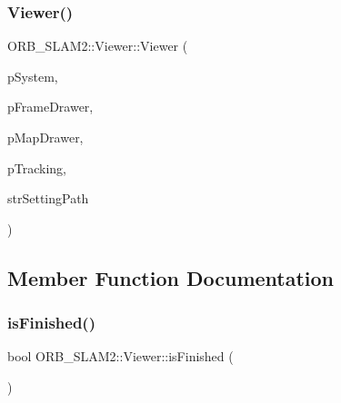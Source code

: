 \subsubsection{\texorpdfstring{Viewer()}{Viewer()}}
{\footnotesize\ttfamily O\+R\+B\+\_\+\+S\+L\+A\+M2\+::\+Viewer\+::\+Viewer (\begin{DoxyParamCaption}\item[{\mbox{\hyperlink{class_o_r_b___s_l_a_m2_1_1_system}{System}} $\ast$}]{p\+System,  }\item[{\mbox{\hyperlink{class_o_r_b___s_l_a_m2_1_1_frame_drawer}{Frame\+Drawer}} $\ast$}]{p\+Frame\+Drawer,  }\item[{\mbox{\hyperlink{class_o_r_b___s_l_a_m2_1_1_map_drawer}{Map\+Drawer}} $\ast$}]{p\+Map\+Drawer,  }\item[{\mbox{\hyperlink{class_o_r_b___s_l_a_m2_1_1_tracking}{Tracking}} $\ast$}]{p\+Tracking,  }\item[{const string \&}]{str\+Setting\+Path }\end{DoxyParamCaption})}



\subsection{Member Function Documentation}
\mbox{\label{class_o_r_b___s_l_a_m2_1_1_viewer_a51c55a1f1ad05a6ba2c6b57f9133f88d}} 
\subsubsection{\texorpdfstring{is\+Finished()}{isFinished()}}
{\footnotesize\ttfamily bool O\+R\+B\+\_\+\+S\+L\+A\+M2\+::\+Viewer\+::is\+Finished (\begin{DoxyParamCaption}{ }\end{DoxyParamCaption})}

\mbox{\label{class_o_r_b___s_l_a_m2_1_1_viewer_aa1888ef340152348f395a814ddfb362f}} 
